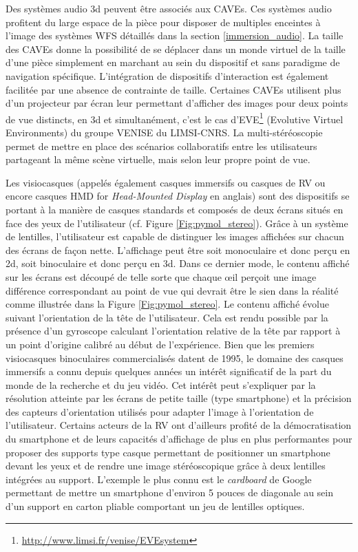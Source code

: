 Des systèmes audio 3d peuvent être associés aux CAVEs. Ces systèmes audio profitent du large espace de la pièce pour disposer de multiples enceintes à l'image des systèmes WFS détaillés dans la section \ref{immersion_audio}.
La taille des CAVEs donne la possibilité de se déplacer dans un monde virtuel de la taille d'une pièce simplement en marchant au sein du dispositif et sans paradigme de navigation spécifique. L'intégration de dispositifs d'interaction est également facilitée par une absence de contrainte de taille. 
Certaines CAVEs utilisent plus d'un projecteur par écran leur permettant d'afficher des images pour deux points de vue distincts, en 3d et simultanément, c'est le cas d'EVE\footnote{\url{http://www.limsi.fr/venise/EVEsystem}} (Evolutive Virtuel Environments) du groupe VENISE du LIMSI-CNRS. La multi-stéréoscopie permet de mettre en place des scénarios collaboratifs entre les utilisateurs partageant la même scène virtuelle, mais selon leur propre point de vue.

Les visiocasques (appelés également casques immersifs ou casques de RV ou encore casques HMD for \textit{Head-Mounted Display} en anglais) sont des dispositifs se portant à la manière de casques standards et composés de deux écrans situés en face des yeux de l'utilisateur (cf. Figure \ref{Fig:pymol_stereo}). Grâce à un système de lentilles, l'utilisateur est capable de distinguer les images affichées sur chacun des écrans de façon nette. L'affichage peut être soit monoculaire et donc perçu en 2d, soit binoculaire et donc perçu en 3d. Dans ce dernier mode, le contenu affiché sur les écrans est découpé de telle sorte que chaque œil perçoit une image différence correspondant au point de vue qui devrait être le sien dans la réalité comme illustrée dans la Figure \ref{Fig:pymol_stereo}. Le contenu affiché évolue suivant l'orientation de la tête de l'utilisateur. Cela est rendu possible par la présence d'un gyroscope calculant l'orientation relative de la tête par rapport à un point d'origine calibré au début de l'expérience. Bien que les premiers visiocasques binoculaires commercialisés datent de 1995, le domaine des casques immersifs a connu depuis quelques années un intérêt significatif de la part du monde de la recherche et du jeu vidéo. Cet intérêt peut s'expliquer par la résolution atteinte par les écrans de petite taille (type smartphone) et la précision des capteurs d'orientation utilisés pour adapter l'image à l'orientation de l'utilisateur. Certains acteurs de la RV ont d'ailleurs profité de la démocratisation du smartphone et de leurs capacités d'affichage de plus en plus performantes pour proposer des supports type casque permettant de positionner un smartphone devant les yeux et de rendre une image stéréoscopique grâce à deux lentilles intégrées au support. L'exemple le plus connu est le \textit{cardboard} de Google permettant de mettre un smartphone d'environ 5 pouces de diagonale au sein d'un support en carton pliable comportant un jeu de lentilles optiques. 

